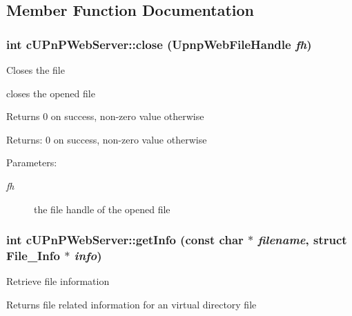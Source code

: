 \subsection{Member Function Documentation}
\hypertarget{classcUPnPWebServer_79d080eaf445325b7f8759dfb0744c26}{
\subsubsection[{close}]{\setlength{\rightskip}{0pt plus 5cm}int cUPnPWebServer::close (UpnpWebFileHandle {\em fh})}}
\label{classcUPnPWebServer_79d080eaf445325b7f8759dfb0744c26}


Closes the file

closes the opened file

Returns 0 on success, non-zero value otherwise

\begin{Desc}
\item[Returns:]0 on success, non-zero value otherwise \end{Desc}
\begin{Desc}
\item[Parameters:]
\begin{description}
\item[{\em fh}]the file handle of the opened file \end{description}
\end{Desc}
\hypertarget{classcUPnPWebServer_0540de6d9f111756593d202f30102ffb}{
\subsubsection[{getInfo}]{\setlength{\rightskip}{0pt plus 5cm}int cUPnPWebServer::getInfo (const char $\ast$ {\em filename}, \/  struct File\_\-Info $\ast$ {\em info})}}
\label{classcUPnPWebServer_0540de6d9f111756593d202f30102ffb}


Retrieve file information

Returns file related information for an virtual directory file

